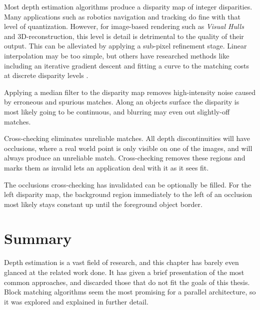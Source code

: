 Most depth estimation algorithms produce a disparity map of integer
disparities. Many applications such as robotics navigation and
tracking do fine with that level of quantization. However, for
image-based rendering such as \textit{Visual Hulls}\cite{torivar} and
3D-reconstruction, this level is detail is detrimental to the quality
of their output. This can be alleviated by applying a sub-pixel
refinement stage. Linear interpolation may be too simple, but others
have researched methods like including an iterative gradient descent
and fitting a curve to the matching costs at discrete disparity levels
\cite{Ryan et al., 1980; Lucas and Kanade, 1981; Tian and Huhns, 1986;
  Matthies et al., 1989; Kanade and okutomi, 1994, taxonomy}.

Applying a median filter to the disparity map removes high-intensity
noise caused by erroneous and spurious matches. Along an objects
surface the disparity is most likely going to be continuous, and
blurring may even out slightly-off matches.

Cross-checking eliminates unreliable matches. All depth
discontinuities will have occlusions, where a real world point is only
visible on one of the images, and will always produce an unreliable
match. Cross-checking removes these regions and marks them as invalid
lets an application deal with it as it sees fit.

The occlusions cross-checking has invalidated can be optionally be
filled. For the left disparity map, the background region immediately
to the left of an occlusion most likely stays constant up until the
foreground object border. 


\section{Summary}

Depth estimation is a vast field of research, and this chapter has
barely even glanced at the related work done. It has given a brief
presentation of the most common approaches, and discarded those that
do not fit the goals of this thesis. Block matching algorithms seem
the most promising for a parallel architecture, so it was explored and
explained in further detail.
